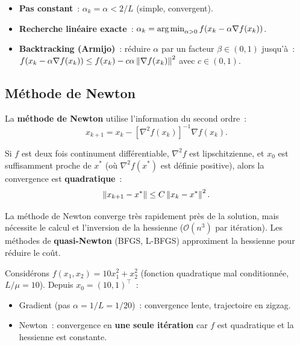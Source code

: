 \begin{formules}[title=\textbf{Choix du pas}]
\begin{itemize}
  \item \textbf{Pas constant}~: $\alpha_k = \alpha < 2/L$ (simple, convergent).
  \item \textbf{Recherche lin\'eaire exacte}~:
        $\alpha_k = \operatorname*{arg\,min}_{\alpha > 0} f(x_k - \alpha \nabla f(x_k))$.
  \item \textbf{Backtracking (Armijo)}~: r\'eduire $\alpha$ par un facteur
        $\beta \in (0,1)$ jusqu'\`a~:
        $f(x_k - \alpha \nabla f(x_k)) \leq f(x_k) -
        c \alpha \left\| \nabla f(x_k) \right\|^2$ avec $c \in (0, 1)$.
\end{itemize}
\end{formules}

\subsection{M\'ethode de Newton}

\begin{definition}
La \textbf{m\'ethode de Newton} utilise l'information du second ordre~:
\[
  x_{k+1} = x_k - [\nabla^2 f(x_k)]^{-1} \nabla f(x_k).
\]
\end{definition}

\begin{theoreme}
Si $f$ est deux fois continument diff\'erentiable, $\nabla^2 f$ est
lipschitzienne, et $x_0$ est suffisamment proche de $x^*$ (o\`u
$\nabla^2 f(x^*)$ est d\'efinie positive), alors la convergence est
\textbf{quadratique}~:
\[
  \left\| x_{k+1} - x^* \right\| \leq C \left\| x_k - x^* \right\|^2.
\]
\end{theoreme}

\begin{remarque}
La m\'ethode de Newton converge tr\`es rapidement pr\`es de la solution, mais
n\'ecessite le calcul et l'inversion de la hessienne ($\mathcal{O}(n^3)$
par it\'eration). Les m\'ethodes de \textbf{quasi-Newton} (BFGS, L-BFGS)
approximent la hessienne pour r\'eduire le co\^ut.
\end{remarque}

\begin{exemple}
Consid\'erons $f(x_1, x_2) = 10 x_1^2 + x_2^2$ (fonction quadratique mal
conditionn\'ee, $L/\mu = 10$). Depuis $x_0 = (10, 1)^\top$~:
\begin{itemize}
  \item Gradient (pas $\alpha = 1/L = 1/20$)~: convergence lente, trajectoire
        en zigzag.
  \item Newton~: convergence en \textbf{une seule it\'eration} car $f$ est
        quadratique et la hessienne est constante.
\end{itemize}
\end{exemple}

